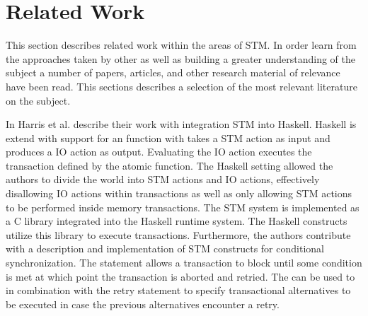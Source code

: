 \section{Related Work}
This section describes related work within the areas of \ac{STM}. In order learn from the approaches taken by other as well as building a greater understanding of the subject a number of papers, articles, and other research material of relevance have been read. This sections describes a selection of the most relevant literature on the subject.

In \cite{harris2005composable} Harris et al. describe their work with integration \ac{STM} into Haskell. Haskell is extend with support for an  function with takes a \ac{STM} action as input and produces a \ac{IO} action as output\cite[p. 51]{harris2005composable}. Evaluating the IO action executes the transaction defined by the atomic function. The Haskell setting allowed the authors to divide the world into \ac{STM} actions and \ac{IO} actions\cite[p. 51]{harris2005composable}, effectively disallowing \ac{IO} actions within transactions as well as only allowing \ac{STM} actions to be performed inside memory transactions. The \ac{STM} system is implemented as a C library integrated into the Haskell runtime system. The Haskell constructs utilize this library to execute transactions\cite[p. 56]{harris2005composable}. Furthermore, the authors contribute with a description and implementation of \ac{STM} constructs for conditional synchronization. The  statement allows a transaction to block until some condition is met at which point the transaction is aborted and retried\cite[p. 52]{harris2005composable}. The  can be used to in combination with the retry statement to specify transactional alternatives to be executed in case the previous alternatives encounter a retry\cite[p. 52]{harris2005composable}.


